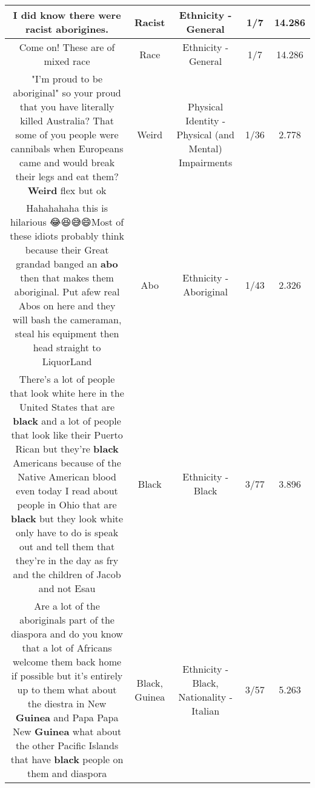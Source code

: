 \documentclass[11pt]{article}
\newlength\mylength
\begin{document}
\begin{center}
\begin{longtable}{|C{.65\mylength}|C{.30\mylength}|C{.12\mylength}|C{.12\mylength}|C{.12\mylength}|}
  \small I did know there were \textbf{racist} aborigines.\normalsize   & Racist & Ethnicity - General & 1/7 & 14.286 \\  \hline
  \small Come on! These are of mixed race\normalsize   & Race & Ethnicity - General & 1/7 & 14.286 \\  \hline
  \small "I'm proud to be aboriginal" so your proud that you have literally killed Australia? That some of you people were cannibals when Europeans came and would break their legs and eat them? \textbf{Weird} flex but ok\normalsize   & Weird & Physical Identity - Physical (and Mental) Impairments & 1/36 & 2.778 \\  \hline
  \small Hahahahaha this is hilarious 😂😆😅😄Most of these idiots probably think because their Great grandad banged an \textbf{abo} then that makes them aboriginal. Put afew real Abos on here and they will  bash the cameraman, steal his equipment then head straight to LiquorLand\normalsize   & Abo & Ethnicity - Aboriginal & 1/43 & 2.326 \\  \hline
  \small There's a lot of people that look white here in the United States that are \textbf{black} and a lot of people that look like their Puerto Rican but they're \textbf{black} Americans because of the Native American blood even today I read about people in Ohio that are \textbf{black} but they look white only have to do is speak out and tell them that they're in the day as fry and the children of Jacob and not Esau\normalsize   & Black & Ethnicity - Black & 3/77 & 3.896 \\  \hline
  \small Are a lot of the aboriginals part of the diaspora and do you know that a lot of Africans welcome them back home if possible but it's entirely up to them what about the diestra in New \textbf{Guinea} and Papa Papa New \textbf{Guinea} what about the other Pacific Islands that have \textbf{black} people on them and diaspora\normalsize   & Black, Guinea & Ethnicity - Black, Nationality - Italian & 3/57 & 5.263 \\  \hline

\end{longtable}
\end{center}
\end{document}
